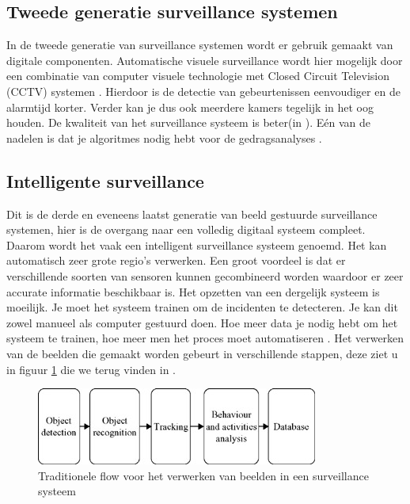 \subsection{Tweede generatie surveillance systemen}
\label{refTGS}
In de tweede generatie van surveillance systemen wordt er gebruik gemaakt van digitale componenten. Automatische visuele surveillance wordt hier mogelijk door een combinatie van computer visuele technologie met Closed Circuit Television (CCTV) systemen \cite{bibIPC2}. Hierdoor is de detectie van gebeurtenissen eenvoudiger en de alarmtijd korter. Verder kan je dus ook meerdere kamers tegelijk in het oog houden. De kwaliteit van het surveillance systeem is beter(in \cite{bibVTC2}). E\'en van de nadelen is dat je algoritmes nodig hebt voor de gedragsanalyses \cite{bibIPC2}.

\subsection{Intelligente surveillance}
\label{refINS}
Dit is de derde en eveneens laatst generatie van beeld gestuurde surveillance systemen, hier is de overgang naar een volledig digitaal systeem compleet\cite{bibVTC2}. Daarom wordt het vaak een intelligent surveillance systeem genoemd. Het kan automatisch zeer grote regio's verwerken. Een groot voordeel is dat er verschillende soorten van sensoren kunnen gecombineerd worden waardoor er zeer accurate informatie beschikbaar is. Het opzetten van een dergelijk systeem is moeilijk. Je moet het systeem trainen om de incidenten te detecteren. Je kan dit zowel manueel als computer gestuurd doen. Hoe meer data je nodig hebt om het systeem te trainen, hoe meer men het proces moet automatiseren \cite{bibVTS}. Het verwerken van de beelden die gemaakt worden gebeurt in verschillende stappen, deze ziet u in figuur \ref{imgVTS} die we terug vinden in \cite{bibIPC2}.
\begin{figure}[hbp]
	\includegraphics[scale=0.8]{FlowSurveillance}
	\caption{Traditionele flow voor het verwerken van beelden in een surveillance systeem}
	\label{imgVTS}
\end{figure}


